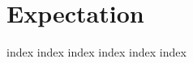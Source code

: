 \chapter{Expectation}
\label{ch:cp}
\ifdefined\HCode
\else
{
\startcontents[chapter]
}
\fi

{index}
{index}
{index}
{index}
{index}
{index}

\ifdefined\HCode
{}
\fi

\ifdefined\HCode
\else
{
\stopcontents[chapter]
}
\fi

\ifdefined\HCode
{}
\fi